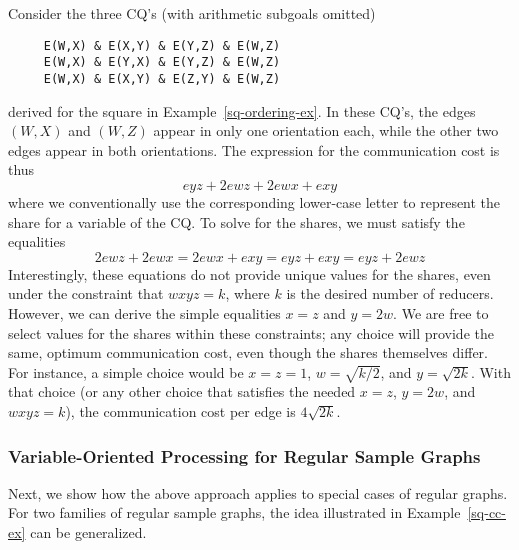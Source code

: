 \begin{example}
\label{sq-cc-ex}
Consider the three CQ's (with arithmetic subgoals omitted)

\begin{verbatim}
     E(W,X) & E(X,Y) & E(Y,Z) & E(W,Z)
     E(W,X) & E(Y,X) & E(Y,Z) & E(W,Z)
     E(W,X) & E(X,Y) & E(Z,Y) & E(W,Z)
\end{verbatim}
derived for the square in Example~\ref{sq-ordering-ex}.
In these CQ's, the edges $(W,X)$ and $(W,Z)$ appear in only one orientation each, while the other two edges appear in both orientations.  The expression for the communication cost is thus
$$eyz + 2ewz + 2ewx + exy$$
where we conventionally use the corresponding lower-case letter to represent the share for a variable of the CQ.
To solve for the shares, we must satisfy the equalities
$$2ewz+2ewx = 2ewx+exy = eyz+exy = eyz+2ewz$$
Interestingly, these equations do not provide unique values for the shares, even under the constraint that $wxyz=k$, where $k$ is the desired number of reducers.  However, we can derive the simple equalities $x=z$ and $y=2w$.  We are free to select values for the shares within these constraints; any choice will provide the same, optimum communication cost, even though the shares themselves differ.  For instance, a simple choice would be $x=z=1$, $w=\sqrt{k/2}$, and $y=\sqrt{2k}$.  With that choice (or any other choice that satisfies the needed $x=z$, $y=2w$, and $wxyz=k$), the communication cost per edge is $4\sqrt{2k}$.
\end{example}


\subsubsection{Variable-Oriented Processing for Regular Sample Graphs}
\label{combine-app-regular}

Next, we show how the above approach applies to special cases of
regular graphs. For two families of regular sample graphs, the idea illustrated in Example~\ref{sq-cc-ex} can be generalized.


